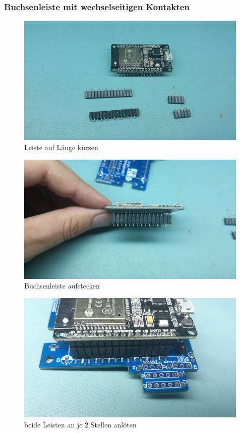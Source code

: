 \documentclass[12pt, a4paper]{article}		%
\begin{document}
\subsubsection{Buchsenleiste mit wechselseitigen Kontakten}
\begin{figure}[H]
	\centering
		\includegraphics[width=0.99\textwidth]{Grafiken/20200726_174543.jpg}
	\caption{Leiste auf Länge kürzen}
	\label{fig:20200726_174543}
\end{figure}

\begin{figure}[H]
	\centering
		\includegraphics[width=0.99\textwidth]{Grafiken/20200726_174611.jpg}
	\caption{Buchsenleiste aufstecken}
	\label{fig:20200726_174611}
\end{figure}

\begin{figure}[H]
	\centering
		\includegraphics[width=0.99\textwidth]{Grafiken/20200726_175629.jpg}
	\caption{beide Leisten an je 2 Stellen anlöten}
	\label{fig:20200726_175629}
\end{figure}
\end{document}
